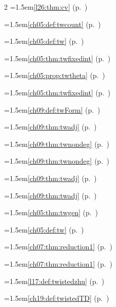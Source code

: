 \begin{multicols}{2}
\hangindent=1.5em\quad \ref{l26:thm:cv} (p.~\pageref{l26:thm:cv})\par
\hangindent=1.5em\quad \ref{ch05:def:twcount} (p.~\pageref{ch05:def:twcount})\par
\hangindent=1.5em\quad \ref{ch05:def:tw} (p.~\pageref{ch05:def:tw})\par
\hangindent=1.5em\quad \ref{ch05:thm:twfixedint} (p.~\pageref{ch05:thm:twfixedint})\par
\hangindent=1.5em\quad \ref{ch05:prop:twtheta} (p.~\pageref{ch05:prop:twtheta})\par
\hangindent=1.5em\quad \ref{ch05:thm:twfixedint} (p.~\pageref{ch05:thm:twfixedint})\par
\hangindent=1.5em\quad \ref{ch09:def:twForm} (p.~\pageref{ch09:def:twForm})\par
\hangindent=1.5em\quad \ref{ch09:thm:twadj} (p.~\pageref{ch09:thm:twadj})\par
\hangindent=1.5em\quad \ref{ch09:thm:twnondeg} (p.~\pageref{ch09:thm:twnondeg})\par
\hangindent=1.5em\quad \ref{ch09:thm:twnondeg} (p.~\pageref{ch09:thm:twnondeg})\par
\hangindent=1.5em\quad \ref{ch09:thm:twadj} (p.~\pageref{ch09:thm:twadj})\par
\hangindent=1.5em\quad \ref{ch09:thm:twadj} (p.~\pageref{ch09:thm:twadj})\par
\hangindent=1.5em\quad \ref{ch05:thm:twgen} (p.~\pageref{ch05:thm:twgen})\par
\hangindent=1.5em\quad \ref{ch05:def:tw} (p.~\pageref{ch05:def:tw})\par
\hangindent=1.5em\quad \ref{ch07:thm:reduction1} (p.~\pageref{ch07:thm:reduction1})\par
\hangindent=1.5em\quad \ref{ch07:thm:reduction1} (p.~\pageref{ch07:thm:reduction1})\par
\hangindent=1.5em\quad \ref{l17:def:twistedzhu} (p.~\pageref{l17:def:twistedzhu})\par
\hangindent=1.5em\quad \ref{ch19:def:twistedTD} (p.~\pageref{ch19:def:twistedTD})\par

\end{multicols}
